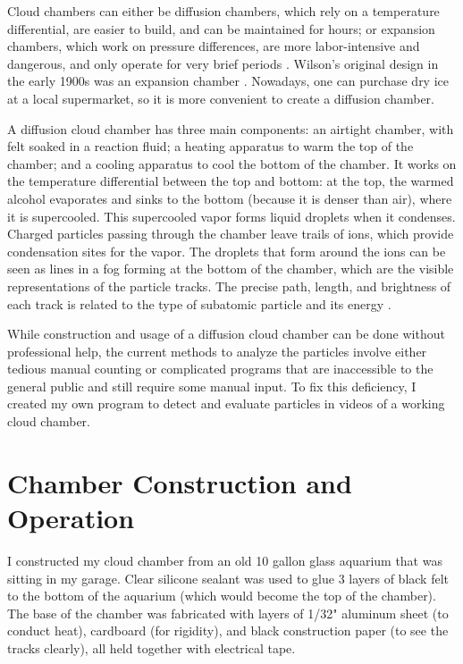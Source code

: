 \documentclass[notitlepage]{article}
\begin{document}
Cloud chambers can either be diffusion chambers, which rely on a temperature differential, are easier to build, and can be maintained for hours; or expansion chambers, which work on pressure differences, are more labor-intensive and dangerous, and only operate for very brief periods \cite{chamberdesign}.  Wilson's original design in the early 1900s was an expansion chamber \cite{1946}.  Nowadays, one can purchase dry ice at a local supermarket, so it is more convenient to create a diffusion chamber.

A diffusion cloud chamber has three main components: an airtight chamber, with felt soaked in a reaction fluid; a heating apparatus to warm the top of the chamber; and a cooling apparatus to cool the bottom of
the chamber.  It works on the temperature differential between the top and bottom: at the top, the warmed alcohol evaporates and sinks to the bottom (because it is denser than air), where it is supercooled. This supercooled vapor forms liquid
droplets when it condenses. Charged particles passing through the chamber leave trails of ions, which provide condensation sites for the vapor.  The droplets that form around the ions can be seen as lines in a fog forming at the bottom of the chamber, which are the visible representations of the particle tracks.  The precise path, length, and brightness of each track is related to the type of subatomic particle and its energy \cite{symmetry}.

While construction and usage of a diffusion cloud chamber can be done without professional help, the current methods to analyze the particles involve either tedious manual counting or complicated programs that are inaccessible to the general public and still require some manual input.  To fix this deficiency, I created my own program to detect and evaluate particles in videos of a working cloud chamber.  

\section{Chamber Construction and Operation}

I constructed my cloud chamber from an old 10 gallon glass aquarium that was sitting in my garage. Clear silicone sealant was used to glue 3 layers of black felt to the bottom of the aquarium (which would become the top of the chamber). The base of the chamber was fabricated with layers of 1/32" aluminum sheet (to conduct heat), cardboard (for rigidity), and black construction paper (to see the tracks clearly), all held together with electrical tape.
\end{document}
